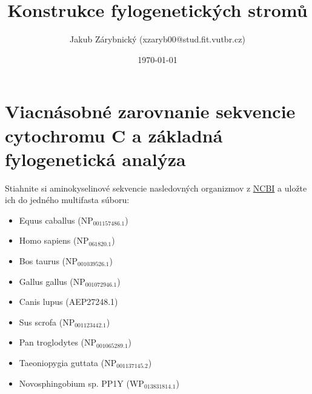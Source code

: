 \documentclass[11pt]{article}
\author{Jakub Zárybnický (xzaryb00@stud.fit.vutbr.cz)}
\date{\today}
\title{Konstrukce fylogenetických stromů}
\begin{document}
\maketitle

\section{Viacnásobné zarovnanie sekvencie cytochromu C a základná fylogenetická analýza}
\label{sec:org9aec594}
Stiahnite si aminokyselinové sekvencie nasledovných organizmov z \href{http://www.ncbi.nlm.nih.gov/protein/}{NCBI} a
uložte ich do jedného multifasta súboru:

\begin{itemize}
\item Equus caballus (NP\(_{\text{001157486.1}}\))
\item Homo sapiens (NP\(_{\text{061820.1}}\))
\item Bos taurus (NP\(_{\text{001039526.1}}\))
\item Gallus gallus (NP\(_{\text{001072946.1}}\))
\item Canis lupus (AEP27248.1)
\item Sus scrofa (NP\(_{\text{001123442.1}}\))
\item Pan troglodytes (NP\(_{\text{001065289.1}}\))
\item Taeoniopygia guttata (NP\(_{\text{001137145.2}}\))
\item Novosphingobium sp. PP1Y (WP\(_{\text{013831814.1}}\))
\end{itemize}
\end{document}
